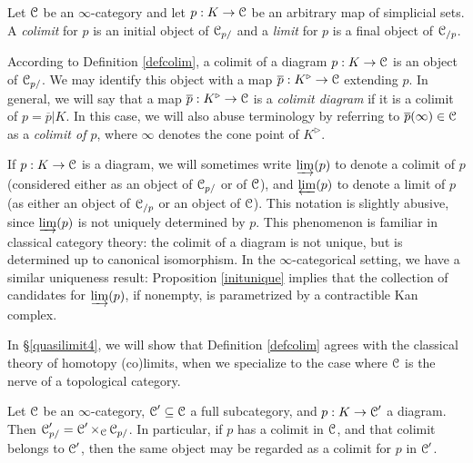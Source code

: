 \begin{1.2.13 Limits and colimits}
\begin{definition}\label{defcolim}
Let $\operatorname{\mathcal{C}}$ be an $\infty$-category and let $p: K \rightarrow \operatorname{\mathcal{C}}$ be an
arbitrary map of simplicial sets. A {\it colimit} for $p$ is
an initial object of $\operatorname{\mathcal{C}}_{p/}$ and a {\it limit} for $p$ is a final
object of $\operatorname{\mathcal{C}}_{/p}$.
\end{definition}

\begin{remark}
According to Definition \ref{defcolim}, a colimit of a diagram $p: K \rightarrow \operatorname{\mathcal{C}}$
is an object of $\operatorname{\mathcal{C}}_{p/}$. We may identify this object with a map
$\overline{p}: K^{\triangleright} \rightarrow \operatorname{\mathcal{C}}$ extending $p$. In general, we will say that a map $\overline{p}: K^{\triangleright} \rightarrow \operatorname{\mathcal{C}}$ is a {\it colimit diagram} if it is a colimit
of $p = \overline{p} | K$. In this case, we will also abuse terminology by referring to
$\overline{p}(\infty) \in \operatorname{\mathcal{C}}$ as a {\it colimit of $p$}, where $\infty$ denotes the cone point of
$K^{\triangleright}$.
\end{remark}

If $p: K \rightarrow \operatorname{\mathcal{C}}$ is a diagram, we will sometimes
write $\varinjlim(p)$ to denote a colimit of $p$ (considered either as an object of
$\operatorname{\mathcal{C}}_{p/}$ or of $\operatorname{\mathcal{C}}$), and $\varprojlim(p)$ to denote a limit of $p$ (as either an object of
$\operatorname{\mathcal{C}}_{/p}$ or an object of $\operatorname{\mathcal{C}}$). This notation is slightly abusive, since $\varinjlim(p)$ is not uniquely determined by $p$. This phenomenon is familiar in classical category theory: the colimit of a diagram is not unique, but is determined up to canonical isomorphism. In the $\infty$-categorical setting, we have a similar uniqueness result: Proposition \ref{initunique} implies that the collection of candidates for $\varinjlim(p)$, if nonempty, is parametrized by a contractible Kan complex.

\begin{remark}
In \S \ref{quasilimit4}, we will show
that Definition \ref{defcolim} agrees with the classical theory of homotopy (co)limits, when
we specialize to the case where $\operatorname{\mathcal{C}}$ is the nerve of a topological category.
\end{remark}

\begin{remark}
Let $\operatorname{\mathcal{C}}$ be an $\infty$-category, $\operatorname{\mathcal{C}}' \subseteq \operatorname{\mathcal{C}}$ a full subcategory,
and $p: K \rightarrow \operatorname{\mathcal{C}}'$ a diagram. Then $\operatorname{\mathcal{C}}'_{p/} = \operatorname{\mathcal{C}}' \times_{\operatorname{\mathcal{C}}}
\operatorname{\mathcal{C}}_{p/}$. In particular, if $p$ has a colimit in $\operatorname{\mathcal{C}}$, and that
colimit belongs to $\operatorname{\mathcal{C}}'$, then the same object may be regarded as a
colimit for $p$ in $\operatorname{\mathcal{C}}'$.
\end{remark}


\end{1.2.13 Limits and colimits}
